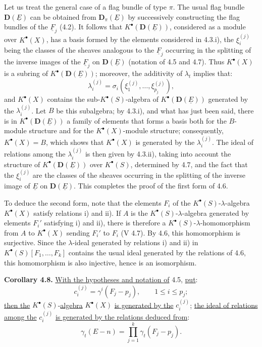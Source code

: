 Let us treat the general case of a flag bundle of type \(\pi\). The usual flag bundle \(\mathbf D(\underline{E})\) can be obtained from \(\mathbf D_\pi(\underline{E})\) by successively constructing the flag bundles of the \(\underline{F}_j\) (4.2). It follows that \(K^{\bullet}(\mathbf D(\underline{E}))\), considered as a module over \(K^{\bullet}(X)\), has a basis formed by the elements considered in 4.3.i), the \(\xi_i^{(j)}\) being the classes of the sheaves analogous to the \(\underline{F}_j\) occurring in the splitting of the inverse images of the \(\underline{F}_j\) on \(\mathbf D(\underline{E})\) (notation of 4.5 and 4.7). Thus \(K^{\bullet}(X)\) is a subring of \(K^{\bullet}(\mathbf D(\underline{E}))\); moreover, the additivity of \(\lambda_t\) implies that:
\[
  \lambda_i^{(j)}=\sigma_i(\xi_1^{(j)},\ldots,\xi_{p_j}^{(j)}),
\]
and \(K^{\bullet}(X)\) contains the sub-\(K^{\bullet}(S)\)-algebra of \(K^{\bullet}(\mathbf D(\underline{E}))\) generated by the \(\lambda_i^{(j)}\). Let \(B\) be this subalgebra; by 4.3.i), and what has just been said, there is in \(K^{\bullet}(\mathbf D(\underline{E}))\) a family of elements that forms a basis both for the \(B\)-module structure and for the \(K^{\bullet}(X)\)-module structure; consequently, \(K^{\bullet}(X)=B\), which shows that \(K^{\bullet}(X)\) is generated by the \(\lambda_i^{(j)}\). The ideal of relations among the \(\lambda_i^{(j)}\) is then given by 4.3.ii), taking
%
into account the structure of \(K^{\bullet}(\mathbf D(\underline{E}))\) over \(K^{\bullet}(S)\), determined by 4.7, and the fact that the \(\xi_i^{(j)}\) are the classes of the sheaves occurring in the splitting of the inverse image of \(\underline{E}\) on \(\mathbf D(\underline{E})\). This completes the proof of the first form of 4.6.

To deduce the second form, note that the elements \(F_i\) of the \(K^{\bullet}(S)\)-\(\lambda\)-algebra \(K^{\bullet}(X)\) satisfy relations i) and ii). If \(A\) is the \(K^{\bullet}(S)\)-\(\lambda\)-algebra generated by elements \(F_i'\) satisfying i) and ii), there is therefore a \(K^{\bullet}(S)\)-\(\lambda\)-homomorphism from \(A\) to \(K^{\bullet}(X)\) sending \(F_i'\) to \(F_i\) (V 4.7). By 4.6, this homomorphism is surjective. Since the \(\lambda\)-ideal generated by relations i) and ii) in \(K^{\bullet}(S)[F_1,\ldots,F_k]\) contains the usual ideal generated by the relations of 4.6, this homomorphism is also injective, hence is an isomorphism.

\textbf{Corollary 4.8.} \uline{With the hypotheses and notation of} 4.5, \uline{put}:
\[
  c_i^{(j)}=\gamma^i(F_j-p_j),
  \qquad 1\le i\le p_j;
\]
\uline{then the} \(K^{\bullet}(S)\)-\uline{algebra} \(K^{\bullet}(X)\) \uline{is generated by the} \(c_i^{(j)}\); \uline{the ideal of relations among the} \(c_i^{(j)}\) \uline{is generated by the relations deduced from}:
\[
  \gamma_t(E-n)=\prod_{j=1}^{k}\gamma_t(F_j-p_j).
\]

